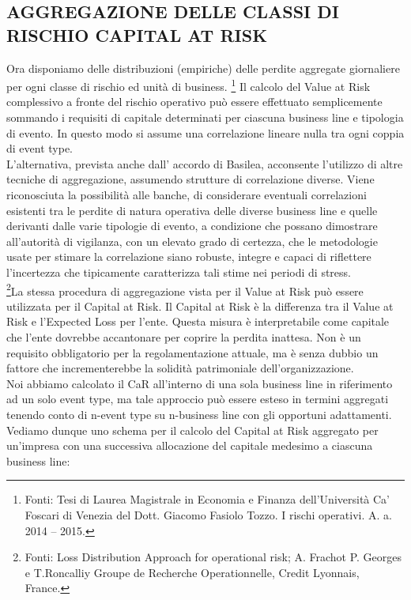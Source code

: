 \documentclass[titlepage]{article}
\begin{document}
\begin{itemize}
{\section{AGGREGAZIONE DELLE CLASSI DI RISCHIO CAPITAL AT RISK}
Ora disponiamo delle distribuzioni (empiriche) delle perdite aggregate giornaliere per ogni classe di rischio ed unità di business. \footnote{Fonti: Tesi di Laurea Magistrale in Economia e Finanza dell’Università Ca’ Foscari di Venezia del Dott. Giacomo Fasiolo Tozzo. I rischi operativi. A. a. 2014 – 2015.} Il calcolo del Value at Risk complessivo a fronte del rischio operativo può essere effettuato semplicemente sommando i requisiti di capitale determinati per ciascuna business line e tipologia di evento. In questo modo si assume una correlazione lineare nulla tra ogni coppia di event type.\\

L’alternativa, prevista anche dall’ accordo di Basilea, acconsente l’utilizzo di altre tecniche di aggregazione, assumendo strutture di correlazione diverse. Viene riconosciuta la possibilità alle banche, di considerare eventuali correlazioni esistenti tra le perdite di natura operativa delle diverse business line e quelle derivanti dalle varie tipologie di evento, a condizione che possano dimostrare all’autorità di vigilanza, con un elevato grado di certezza, che le metodologie usate per stimare la correlazione siano robuste, integre e capaci di riflettere l’incertezza che tipicamente caratterizza tali stime nei periodi di stress.
\\
\footnote{Fonti: Loss Distribution Approach for operational risk; A. Frachot P. Georges e T.Roncalliy Groupe de Recherche Operationnelle, Credit Lyonnais, France.}La stessa procedura di aggregazione vista per il Value at Risk può essere utilizzata per il Capital at Risk. Il Capital at Risk è la differenza tra il Value at Risk e l’Expected Loss per l’ente. Questa misura è interpretabile come capitale che l’ente dovrebbe accantonare per coprire la perdita inattesa. Non è un requisito obbligatorio per la regolamentazione attuale, ma è senza dubbio un fattore che incrementerebbe la solidità patrimoniale dell’organizzazione.
\\
Noi abbiamo calcolato il CaR all’interno di una sola business line in riferimento ad un solo event type, ma tale approccio può essere esteso in termini aggregati tenendo conto di n-event type su n-business line con gli opportuni adattamenti. 
Vediamo dunque uno schema per il calcolo del Capital at Risk aggregato per un’impresa con una successiva allocazione del capitale medesimo a ciascuna business line:
\begin{itemize}



\end{itemize}}
\end{itemize}
\end{document}
